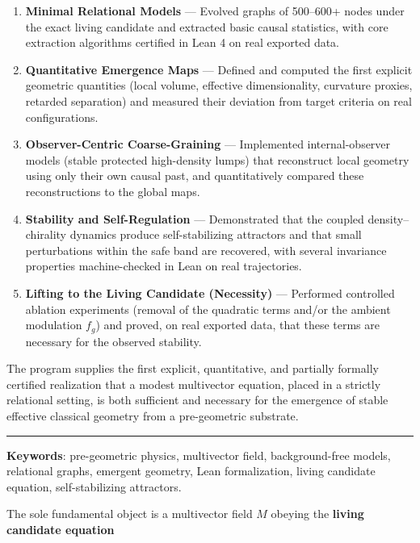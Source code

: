 \documentclass[
  11pt,
  a4paper,
]{article}
\providecommand{\tightlist}{%
  \setlength{\itemsep}{0pt}\setlength{\parskip}{0pt}}
\begin{document}
\begin{enumerate}
\def\labelenumi{\arabic{enumi}.}
\tightlist
\item
  \textbf{Minimal Relational Models} --- Evolved graphs of 500--600+
  nodes under the exact living candidate and extracted basic causal
  statistics, with core extraction algorithms certified in Lean 4 on
  real exported data.
\item
  \textbf{Quantitative Emergence Maps} --- Defined and computed the
  first explicit geometric quantities (local volume, effective
  dimensionality, curvature proxies, retarded separation) and measured
  their deviation from target criteria on real configurations.
\item
  \textbf{Observer-Centric Coarse-Graining} --- Implemented
  internal-observer models (stable protected high-density lumps) that
  reconstruct local geometry using only their own causal past, and
  quantitatively compared these reconstructions to the global maps.
\item
  \textbf{Stability and Self-Regulation} --- Demonstrated that the
  coupled density--chirality dynamics produce self-stabilizing
  attractors and that small perturbations within the safe band are
  recovered, with several invariance properties machine-checked in Lean
  on real trajectories.
\item
  \textbf{Lifting to the Living Candidate (Necessity)} --- Performed
  controlled ablation experiments (removal of the quadratic terms and/or
  the ambient modulation \(f_g\)) and proved, on real exported data,
  that these terms are necessary for the observed stability.
\end{enumerate}

The program supplies the first explicit, quantitative, and partially
formally certified realization that a modest multivector equation,
placed in a strictly relational setting, is both sufficient and
necessary for the emergence of stable effective classical geometry from
a pre-geometric substrate.

\begin{center}\rule{0.5\linewidth}{0.5pt}\end{center}

\textbf{Keywords}: pre-geometric physics, multivector field,
background-free models, relational graphs, emergent geometry, Lean
formalization, living candidate equation, self-stabilizing attractors.

The sole fundamental object is a multivector field \(M\) obeying the
\textbf{living candidate equation}
\end{document}
